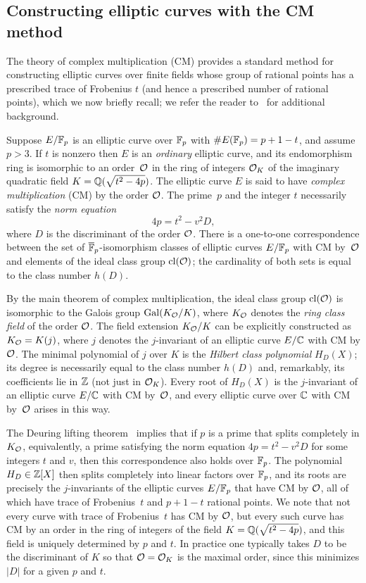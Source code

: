 \documentclass[12pt]{amsart}
\begin{document}
\subsection{Constructing elliptic curves with the CM method} 
The theory of complex multiplication (CM) provides a standard method for constructing elliptic curves over finite fields whose group of rational points has a prescribed trace of Frobenius $t$ (and hence a prescribed number of rational points), which we now briefly recall; we refer the reader to~\cite{Cox} for additional background.

Suppose $E/\mathbb{F}_p$ is an elliptic curve over $\mathbb{F}_p$ with $\#E(\mathbb{F}_p)=p+1-t$,
and assume $p>3$.
If $t$ is nonzero then $E$ is an \emph{ordinary} elliptic curve, and its endomorphism ring is isomorphic to an order~${\mathcal O}$ in the ring of integers ${\mathcal O}_K$ of the imaginary quadratic field $K=\mathbb{Q}(\sqrt{t^2-4p})$.
The elliptic curve $E$ is said to have \emph{complex multiplication} (CM) by the order ${\mathcal O}$.
The prime~$p$ and the integer $t$ necessarily satisfy the \emph{norm equation}
$$
4p = t^2-v^2D,
$$
where $D$ is the discriminant of the order ${\mathcal O}$.
There is a one-to-one correspondence between the set of $\overline{\mathbb{F}}_p$-isomorphism classes of elliptic curves $E/\mathbb{F}_p$ with CM by~${\mathcal O}$ and elements of the ideal class group ${\rm cl}({\mathcal O})$; the cardinality of both sets is equal to the class number $h(D)$.

By the main theorem of complex multiplication, the ideal class group ${\rm cl}({\mathcal O})$ is isomorphic to the Galois group ${\rm Gal}(K_{\mathcal O}/K)$, where $K_{\mathcal O}$ denotes the \emph{ring class field} of the order ${\mathcal O}$.
The field extension $K_{\mathcal O}/K$ can be explicitly constructed as $K_{\mathcal O} = K(j)$, where $j$ denotes the $j$-invariant of an elliptic curve $E/\mathbb{C}$ with CM by ${\mathcal O}$.
The minimal polynomial of $j$ over $K$ is the \emph{Hilbert class polynomial} $H_D(X)$; its degree is necessarily equal to the class number $h(D)$ and, remarkably, its coefficients lie in $\mathbb{Z}$ (not just in ${\mathcal O}_K$).
Every root of $H_D(X)$ is the $j$-invariant of an elliptic curve $E/\mathbb{C}$ with CM by~${\mathcal O}$, and every elliptic curve over $\mathbb{C}$ with CM by~${\mathcal O}$ arises in this way.

The Deuring lifting theorem~\cite[Theorems~13.12-14]{Lang} implies that if $p$ is a prime that splits completely in $K_{\mathcal O}$, equivalently, a prime satisfying the norm equation $4p=t^2-v^2D$ for some integers $t$ and $v$, then this correspondence also holds over $\mathbb{F}_p$.
The polynomial $H_D\in \mathbb{Z}[X]$ then splits completely into linear factors over $\mathbb{F}_p$, and its roots are precisely the $j$-invariants of the elliptic curves $E/\mathbb{F}_p$ that have CM by ${\mathcal O}$, all of which have trace of Frobenius~$t$ and $p+1-t$ rational points.
We note that not every curve with trace of Frobenius~$t$ has CM by ${\mathcal O}$, but every such curve has CM by an order in the ring of integers of the field $K=\mathbb{Q}(\sqrt{t^2-4p})$, and this field is uniquely determined by $p$ and $t$.
In practice one typically takes $D$ to be the discriminant of $K$ so that ${\mathcal O}={\mathcal O}_K$ is the maximal order, since this minimizes $|D|$ for a given $p$ and $t$.
\end{document}
